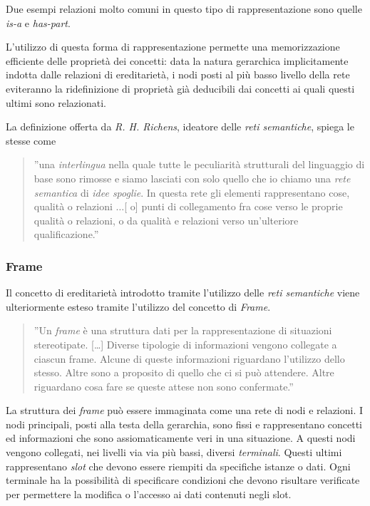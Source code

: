 Due esempi relazioni molto comuni in questo tipo di rappresentazione sono quelle  \emph{is-a} e \emph{has-part}. 

L'utilizzo di questa forma di rappresentazione permette una memorizzazione efficiente delle proprietà dei concetti: data la natura gerarchica implicitamente indotta dalle relazioni di ereditarietà, i nodi posti al più basso livello della rete eviteranno la ridefinizione di proprietà già deducibili dai concetti ai quali questi ultimi sono relazionati.

La definizione offerta da \emph{R. H. Richens}, ideatore delle \emph{reti semantiche}, spiega le stesse come
\begin{quote}
''una \emph{interlingua} nella quale tutte le peculiarità strutturali del linguaggio di base sono rimosse e siamo lasciati con solo quello che io chiamo una \emph{rete semantica} di \emph{idee spoglie}. In questa rete gli elementi rappresentano cose, qualità o relazioni $\dots$[ o] punti di collegamento fra cose verso le proprie qualità o relazioni, o da qualità e relazioni verso un'ulteriore qualificazione.'' \cite{richens1956}
\end{quote}

\subsubsection{Frame}
Il concetto di ereditarietà introdotto tramite l'utilizzo delle \emph{reti semantiche} viene ulteriormente esteso tramite l'utilizzo del concetto di \emph{Frame}. 
\begin{quote}
''Un \emph{frame} è una struttura dati per la rappresentazione di situazioni stereotipate. [\dots] Diverse tipologie di informazioni vengono collegate a ciascun frame. Alcune di queste informazioni riguardano l'utilizzo dello stesso. Altre sono a proposito di quello che ci si può attendere. Altre riguardano cosa fare se queste attese non sono confermate.'' \cite{minsky1974}
\end{quote}

La struttura dei \emph{frame} può essere immaginata come una rete di nodi e relazioni. I nodi principali, posti alla testa della gerarchia, sono fissi e rappresentano concetti ed informazioni che sono assiomaticamente veri in una situazione. A questi nodi vengono collegati, nei livelli via via più bassi, diversi \emph{terminali}. Questi ultimi rappresentano \emph{slot} che devono essere riempiti da specifiche istanze o dati. Ogni terminale ha la possibilità di specificare condizioni che devono risultare verificate per permettere la modifica o l'accesso ai dati contenuti negli slot. 

